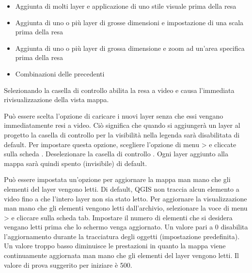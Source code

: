 \begin{itemize}
\item Aggiunta di molti layer e applicazione di uno stile visuale prima della
resa
\item Aggiunta di uno o più layer di grosse dimensioni e impostazione di una
scala prima della resa
\item Aggiunta di uno o più layer di grossa dimensione e zoom ad un'area specifica prima della resa
\item Combinazioni delle precedenti
\end{itemize}

Selezionando la casella di controllo  abilita la resa a
video e causa l'immediata rivisualizzazione della vista mappa.

\label{label_settinglayer}

Può essere scelta l'opzione di caricare i nuovi layer senza che essi vengano
immediatamente resi a video. Ciò significa che quando si aggiungerà un layer
al progetto la casella di controllo per la visibilità nella legenda sarà
disabilitata di default. Per impostare questa opzione, scegliere l'opzione di
menu  >  e cliccate sulla
scheda . Deselezionare la casella di controllo . Ogni layer aggiunto alla mappa sarà quindi spento
(invisibile) di default.

%
%

\label{label_updatemap}

Può essere impostata un'opzione per aggiornare la mappa man mano che gli
elementi del layer vengono letti. Di default, QGIS non traccia alcun elemento a video
fino a che l'intero layer non sia stato letto. Per aggiornare la visualizzazione
man mano che gli elementi vengono letti dall'archivio, selezionare la
voce di menu  >  e cliccare sulla
scheda  tab. Impostare il numero di elementi che si desidera
vengano letti prima che lo schermo venga aggiornato. Un valore pari a 0
disabilita l'aggiornamento durante la tracciatura degli oggetti (impostazione
predefinita). Un valore troppo basso diminuisce le prestazioni in quanto la
mappa viene continuamente aggiornata man mano che gli elementi del layer
vengono letti. Il valore di prova suggerito per iniziare è 500. 

